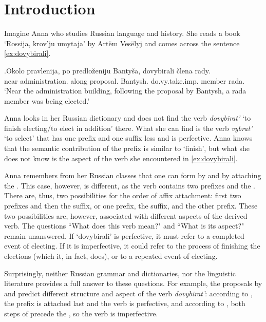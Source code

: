 
\chapter{Introduction} %
\label{Chapter1}
Imagine Anna who studies Russian language and history. She reads a book `Rossija, krov'ju umytaja' by Art\"{e}m Ves\"{e}lyj  and comes across the sentence \ref{ex:dovybirali}.

\exg.\label{ex:dovybirali}Okolo pravlenija, po predlo\v{z}eniju Banty\v{s}a, dovybirali \v{c}lena rady.\\
near administration. along proposal. Bantysh. do.vy.take.imp. member rada.\\
\vspace{0.3em}
`Near the administration building, following the proposal by Bantysh, a rada member was being elected.'

Anna looks in her Russian dictionary and does not find the verb \textit{dovybirat'} `to finish electing/to elect in addition' there.  What she can find is the verb \textit{vybrat'} `to select'  that has one prefix and one suffix less and is perfective. Anna knows that the semantic contribution of the prefix  is similar to `finish', but what she does not know is the aspect of the verb she encountered in \ref{ex:dovybirali}. 

Anna remembers from her Russian classes that one can form  by  and  by attaching the . This case, however, is different, as the verb contains two prefixes and the . There are, thus, two possibilities for the order of affix attachment: first two prefixes and then the suffix, or one prefix, the suffix, and the other prefix. These two possibilities are, however, associated with different aspects of the derived verb. The questions ``What does this verb mean?" and ``What is its aspect?" remain unanswered. If `dovybirali' is perfective, it must refer to a completed event of electing. If it is imperfective, it could refer to the process of finishing the elections (which it, in fact, does), or to a repeated event of electing. 

Surprisingly, neither Russian grammar and dictionaries, nor the linguistic literature provides a full answer to these questions. For example, the proposals by \citet{Svenonius:04b} and \citet{Tatevosov:07} predict different  structure and aspect of the verb \textit{dovybirat'}: according to \citet{Svenonius:04b}, the prefix  is attached last and the verb is perfective, and according to \citet{Tatevosov:07}, both steps of  precede the , so the verb is imperfective.

